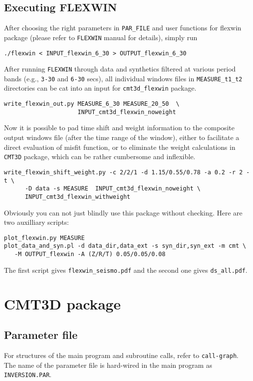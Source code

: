 \documentclass[12pt,titlepage,fleqn]{article}
\begin{document}
\subsection{Executing FLEXWIN}
After choosing the right parameters in \verb=PAR_FILE= and user functions for flexwin package (please refer to \verb+FLEXWIN+ manual for details), simply run
\begin{verbatim}
./flexwin < INPUT_flexwin_6_30 > OUTPUT_flexwin_6_30
\end{verbatim}
After running \verb+FLEXWIN+ through data and synthetics filtered at various period bands (e.g., \verb+3-30+ and \verb+6-30+ secs),  all individual windows files in \verb+MEASURE_t1_t2+ directories can be cat into an input for \verb=cmt3d_flexwin= package.
\begin{verbatim}
write_flexwin_out.py MEASURE_6_30 MEASURE_20_50  \
                     INPUT_cmt3d_flexwin_noweight
\end{verbatim}
Now it is possible to pad time shift and weight information to the composite output windows file (after the time range of the window), either to facilitate a direct evaluation of misfit function, or to eliminate the weight calculations in \verb+CMT3D+ package, which can be rather cumbersome and inflexible.
\begin{verbatim}
write_flexwin_shift_weight.py -c 2/2/1 -d 1.15/0.55/0.78 -a 0.2 -r 2 -t \
      -D data -s MEASURE  INPUT_cmt3d_flexwin_noweight \
      INPUT_cmt3d_flexwin_withweight
\end{verbatim}
Obviously you can not just blindly use this package without checking. Here are two auxilliary scripts:
\begin{verbatim}
plot_flexwin.py MEASURE
plot_data_and_syn.pl -d data_dir,data_ext -s syn_dir,syn_ext -m cmt \
   -M OUTPUT_flexwin -A (Z/R/T) 0.05/0.05/0.08
\end{verbatim}
The first script gives \verb+flexwin_seismo.pdf+ and the second one gives \verb+ds_all.pdf+.
\section{CMT3D package}
\subsection{Parameter file}
For structures of the main program and subroutine calls, refer to \verb=call-graph=. The name of the parameter file is hard-wired in the main program as \verb=INVERSION.PAR=.
\end{document}
